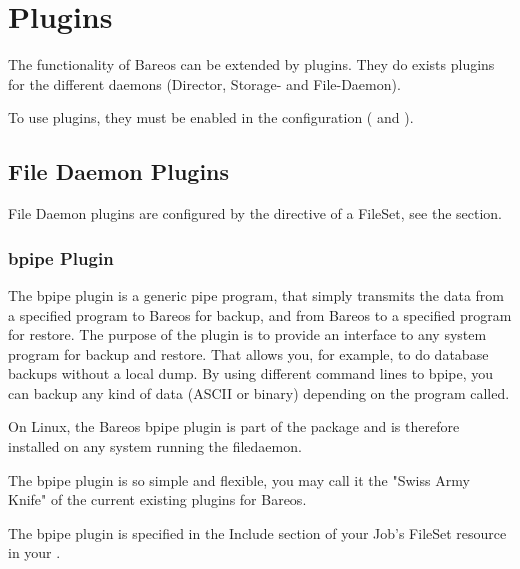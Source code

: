 \chapter{Plugins}

The functionality of Bareos can be extended by plugins.
They do exists plugins for the different daemons (Director, Storage- and File-Daemon).

To use plugins, they must be enabled in the configuration ( and ).



\section{File Daemon Plugins}
\label{fdPlugins}

File Daemon plugins are configured by the  directive of a FileSet, see the  section.


\subsection{bpipe Plugin}
\label{bpipe}

The bpipe plugin is a generic pipe program, that simply transmits the data from a specified program to Bareos for backup, and
from Bareos to a specified program for restore. The purpose of the plugin is to provide an interface to any system program
for backup and restore. That allows you, for example, to do database backups without a local dump. By using different command 
lines to bpipe, you can backup any kind of data (ASCII or binary) depending on the program called.

On Linux, the Bareos bpipe plugin is part of the  package and is therefore installed on any system running the filedaemon.

The bpipe plugin is so simple and flexible, you may call it the 
"Swiss Army Knife" of the current existing plugins for Bareos.

The bpipe plugin is specified in the Include section of your Job's FileSet resource in your .

